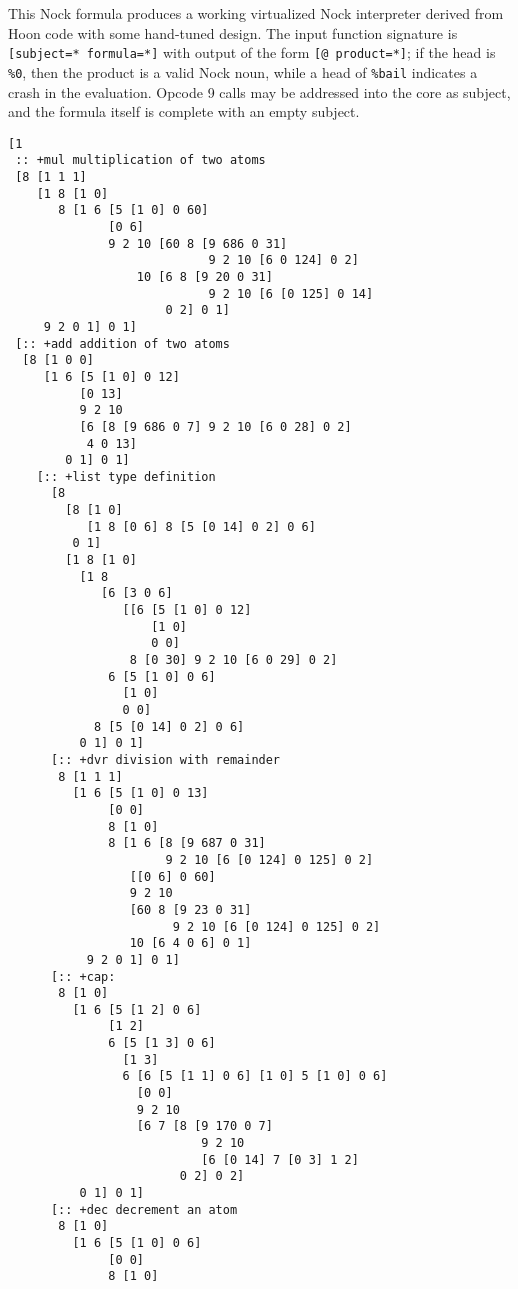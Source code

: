 \documentclass[twoside]{article}
\begin{document}
This Nock formula produces a working virtualized Nock interpreter derived from Hoon code with some hand-tuned design.  The input function signature is \lstinline[style=inlinecode]{[subject=* formula=*]} with output of the form \lstinline[style=inlinecode]{[@ product=*]}; if the head is \lstinline[style=inlinecode]{%0}, then the product is a valid Nock noun, while a head of \lstinline[style=inlinecode]{%bail} indicates a crash in the evaluation.  Opcode 9 calls may be addressed into the core as subject, and the formula itself is complete with an empty subject.

\begin{lstlisting}[style=listingcode]
[1
 :: +mul multiplication of two atoms
 [8 [1 1 1]
    [1 8 [1 0]
       8 [1 6 [5 [1 0] 0 60]
              [0 6]
              9 2 10 [60 8 [9 686 0 31]
                            9 2 10 [6 0 124] 0 2]
                  10 [6 8 [9 20 0 31]
                            9 2 10 [6 [0 125] 0 14]
                      0 2] 0 1]
     9 2 0 1] 0 1]
 [:: +add addition of two atoms
  [8 [1 0 0]
     [1 6 [5 [1 0] 0 12]
          [0 13]
          9 2 10
          [6 [8 [9 686 0 7] 9 2 10 [6 0 28] 0 2]
           4 0 13]
        0 1] 0 1]
    [:: +list type definition
      [8
        [8 [1 0]
           [1 8 [0 6] 8 [5 [0 14] 0 2] 0 6]
         0 1]
        [1 8 [1 0]
          [1 8
             [6 [3 0 6]
                [[6 [5 [1 0] 0 12]
                    [1 0]
                    0 0]
                 8 [0 30] 9 2 10 [6 0 29] 0 2]
              6 [5 [1 0] 0 6]
                [1 0]
                0 0]
            8 [5 [0 14] 0 2] 0 6]
          0 1] 0 1]
      [:: +dvr division with remainder
       8 [1 1 1]
         [1 6 [5 [1 0] 0 13]
              [0 0]
              8 [1 0]
              8 [1 6 [8 [9 687 0 31]
                      9 2 10 [6 [0 124] 0 125] 0 2]
                 [[0 6] 0 60]
                 9 2 10
                 [60 8 [9 23 0 31]
                       9 2 10 [6 [0 124] 0 125] 0 2]
                 10 [6 4 0 6] 0 1]
           9 2 0 1] 0 1]
      [:: +cap: 
       8 [1 0]
         [1 6 [5 [1 2] 0 6]
              [1 2]
              6 [5 [1 3] 0 6]
                [1 3]
                6 [6 [5 [1 1] 0 6] [1 0] 5 [1 0] 0 6]
                  [0 0]
                  9 2 10
                  [6 7 [8 [9 170 0 7]
                           9 2 10
                           [6 [0 14] 7 [0 3] 1 2]
                        0 2] 0 2]
          0 1] 0 1]
      [:: +dec decrement an atom
       8 [1 0]
         [1 6 [5 [1 0] 0 6]
              [0 0]
              8 [1 0]

\end{lstlisting}
\end{document}
